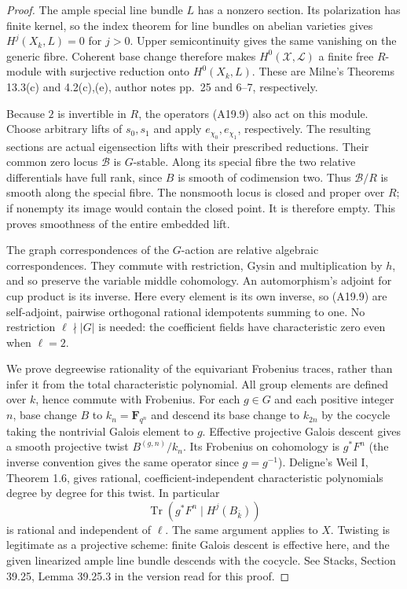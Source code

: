 \documentclass[11pt]{article}
\theoremstyle{remark}\newtheorem{remark}[theorem]{Remark}
\begin{document}
\begin{proof}
The ample special line bundle $L$ has a nonzero section.
Its polarization has finite kernel, so the index theorem
for line bundles on abelian varieties gives
$H^j(X_k,L)=0$ for $j>0$. Upper semicontinuity gives the
same vanishing on the generic fibre. Coherent base change
therefore makes $H^0(\mathcal X,\mathcal L)$ a finite
free $R$-module with surjective reduction onto
$H^0(X_k,L)$. These are Milne's Theorems 13.3(c) and
4.2(c),(e), author notes pp.~25 and 6--7, respectively.

Because $2$ is invertible in $R$, the operators (A19.9)
also act on this module. Choose arbitrary lifts of
$s_0,s_1$ and apply $e_{\chi_0},e_{\chi_1}$, respectively.
The resulting sections are actual eigensection lifts
with their prescribed reductions. Their common zero
locus $\mathcal B$ is $G$-stable. Along its special fibre
the two relative differentials have full rank, since
$B$ is smooth of codimension two. Thus $\mathcal B/R$
is smooth along the special fibre. The nonsmooth locus
is closed and proper over $R$; if nonempty its image
would contain the closed point. It is therefore empty.
This proves smoothness of the entire embedded lift.

The graph correspondences of the $G$-action are relative
algebraic correspondences. They commute with restriction,
Gysin and multiplication by $h$, and so preserve the
variable middle cohomology. An automorphism's adjoint
for cup product is its inverse. Here every element is
its own inverse, so (A19.9) are self-adjoint,
pairwise orthogonal rational idempotents summing to one.
No restriction $\ell\nmid|G|$ is needed: the coefficient
fields have characteristic zero even when $\ell=2$.

We prove degreewise rationality of the equivariant
Frobenius traces, rather than infer it from the total
characteristic polynomial. All group elements are
defined over $k$, hence commute with Frobenius. For
each $g\in G$ and each positive integer $n$, base change
$B$ to $k_n=\mathbf F_{q^n}$ and descend its base change
to $k_{2n}$ by the cocycle taking the nontrivial Galois
element to $g$. Effective projective Galois descent
gives a smooth projective twist $B^{(g,n)}/k_n$.
Its Frobenius on cohomology is $g^*F^n$ (the inverse
convention gives the same operator since $g=g^{-1}$).
Deligne's Weil I, Theorem 1.6, gives rational,
coefficient-independent characteristic polynomials
degree by degree for this twist. In particular
\[
       \operatorname{Tr}(g^*F^n\mid H^j(B_{\bar k}))
 \tag{A19.10}
\]
is rational and independent of $\ell$. The same argument
applies to $X$. Twisting is legitimate as a projective
scheme: finite Galois descent is effective here, and
the given linearized ample line bundle descends with
the cocycle. See Stacks, Section 39.25, Lemma 39.25.3
in the version read for this proof.


\end{proof}
\end{document}
